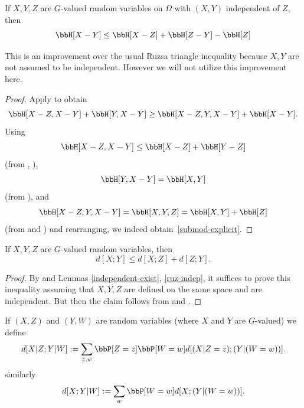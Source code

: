 \begin{lemma}
  \label{ruzsa-triangle-improved}
  \leanok
  If $X,Y,Z$ are $G$-valued random variables on $\Omega$ with $(X,Y)$ independent of $Z$, then
  \begin{equation}\label{submod-explicit} \bbH[X - Y] \leq \bbH[X-Z] + \bbH[Z-Y] - \bbH[Z]\end{equation}
\end{lemma}

This is an improvement over the usual Ruzsa triangle inequality because $X,Y$ are not assumed to be independent.  However we will not utilize this improvement here.

\begin{proof}
  \leanok
  Apply  to obtain
  \[\bbH[X - Z, X - Y] + \bbH[Y, X - Y] \geq \bbH[X - Z, Y, X - Y] + \bbH[X - Y].\]
  Using
  \[\bbH[X - Z, X - Y] \leq \bbH[X - Z] + \bbH[Y - Z]\]
  (from , ),
  \[\bbH[Y, X - Y] = \bbH[X, Y] \]
  (from ), and
  \[\bbH[X - Z, Y, X - Y] = \bbH[X, Y, Z] = \bbH[X, Y] + \bbH[Z]\]
  (from  and ) and rearranging, we indeed obtain~\eqref{submod-explicit}.
\end{proof}

\begin{lemma}
  \label{ruzsa-triangle}
  \leanok
  If $X,Y,Z$ are $G$-valued random variables, then
$$ d[X ;Y] \leq d[X ;Z] + d[Z;Y].$$
\end{lemma}

\begin{proof}\leanok By  and Lemmas \ref{independent-exist}, \ref{ruz-indep}, it suffices to prove this inequality assuming that $X,Y,Z$ are defined on the same space and are independent.  But then the claim follows from  and .
\end{proof}

\begin{definition}\label{cond-dist-def}
  \leanok
If $(X, Z)$ and $(Y, W)$ are random variables (where $X$ and $Y$ are $G$-valued) we define
$$ d[X  | Z; Y | W] := \sum_{z,w}  \bbP[Z=z]  \bbP[W=w] d[(X|Z=z); (Y|(W=w))].$$
similarly
$$ d[X ; Y | W] := \sum_{w}  \bbP[W=w] d[X ; (Y|(W=w))].$$
\end{definition}

